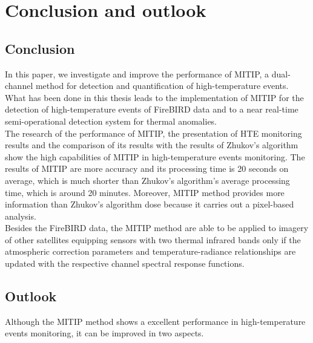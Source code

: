 \chapter{Conclusion and outlook}

\label{Chapter6}


\section{Conclusion}
In this paper, we investigate and improve the performance of MITIP, a dual-channel method for detection and quantification of high-temperature events. What has been done in this thesis leads to the implementation of MITIP for the detection of high-temperature events of FireBIRD data and to a near real-time semi-operational detection system for thermal anomalies.\\

\noindent The research of the performance of MITIP, the presentation of HTE monitoring results and the comparison of its results with the results of Zhukov's algorithm show the high capabilities of MITIP in high-temperature events monitoring. The results of MITIP are more accuracy and its processing time is 20 seconds on average, which is much shorter than Zhukov's algorithm's average processing time, which is around 20 minutes. Moreover, MITIP method provides more information than Zhukov's algorithm dose because it carries out a pixel-based analysis.\\

\noindent Besides the FireBIRD data, the MITIP method are able to be applied to imagery of other satellites equipping sensors with two thermal infrared bands only if the atmospheric correction parameters and temperature-radiance relationships are updated with the respective channel spectral response functions.\\


\section{Outlook}
Although the MITIP method shows a excellent performance in high-temperature events monitoring, it can be improved in two aspects.\\

